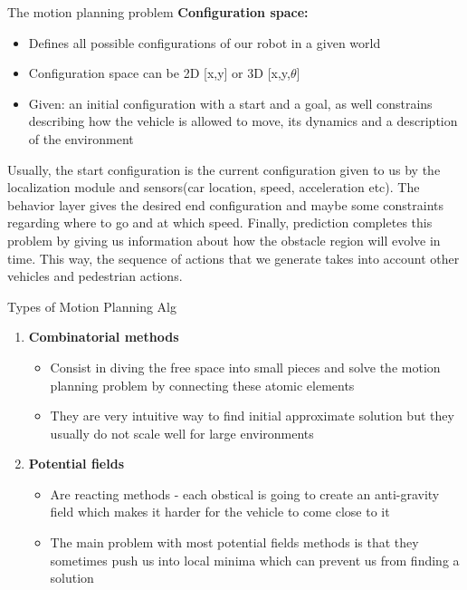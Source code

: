 \documentclass[10pt,mathserif]{beamer}
\begin{document}
\begin{frame}{The motion planning problem}
\textbf{Configuration space:}
\begin{itemize}
\item Defines all possible configurations of our robot in a given world
\item Configuration space can be 2D [x,y] or 3D [x,y,$\theta$]
\item  Given: an initial configuration with a start and a goal, as well constrains describing how the
vehicle is allowed to move, its dynamics and a description of the environment
\end{itemize}
Usually, the start configuration is the current configuration given to us by the localization module and sensors(car location, speed, acceleration etc). The behavior layer gives the desired end configuration and maybe some constraints regarding where to go and at which speed.
Finally, prediction completes this problem by giving us information about how the obstacle region will evolve in time. This way, the sequence of actions that we generate takes into account other vehicles and pedestrian actions. 
\end{frame}


\begin{frame}{Types of Motion Planning Alg}
\begin{enumerate}
\item \textbf{Combinatorial methods}
\begin{itemize}
\item Consist in diving the free space into small pieces and solve the motion planning problem by connecting these atomic elements
\item They are very intuitive way to find initial approximate solution but they usually do not scale well for large environments
\end{itemize}
\item \textbf{Potential fields}
\begin{itemize}
\item Are reacting methods - each obstical is going to create an anti-gravity field
which makes it harder for the vehicle to come close to it
\item The main problem with most potential fields methods is that they sometimes push us into local minima which can prevent us from finding a solution
\end{itemize}
\end{enumerate}
\end{frame}
\end{document}
